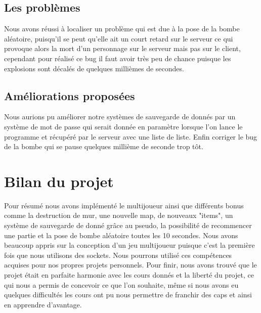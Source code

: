 \documentclass[12pt]{article}
\begin{document}
        \subsection{Les problèmes}
        Nous avons réussi à localiser un problème qui est due à la pose de la bombe aléatoire, puisqu'il se peut qu'elle ait un court retard sur le serveur ce qui provoque alors la mort d'un personnage sur le serveur mais pas sur le client, cependant pour réalisé ce bug il faut avoir très peu de chance puisque les explosions sont décalés de quelques millièmes de secondes.

        \subsection{Améliorations proposées}
        Nous aurions pu améliorer notre systèmes de sauvegarde de donnés par un système de mot de passe qui serait donnée en paramètre lorsque l'on lance le programme et récupéré par le serveur avec une liste de liste.
        Enfin corriger le bug de la bombe qui se pause quelques millième de seconde trop tôt.

    \clearpage
    \section{Bilan du projet}

    Pour résumé nous avons implémenté le multijoueur ainsi que différents bonus comme la destruction de mur, une nouvelle map, de nouveaux "items", un système de sauvegarde de donné grâce au pseudo, la possibilité de recommencer une partie et la pose de bombe aléatoire toutes les 10 secondes.
    Nous avons beaucoup appris sur la conception d'un jeu multijoueur puisque c'est la première fois que nous utilisons des sockets. Nous pourrons utilisé ces compétences acquises pour nos propres projets personnels.
    Pour finir, nous avons trouvé que le projet était en parfaite harmonie avec les cours donnés et la liberté du projet, ce qui nous a permis de concevoir ce que l'on souhaite, même si nous avons eu quelques difficultés les cours ont pu nous permettre de franchir des caps et ainsi en apprendre d'avantage.

    \clearpage
    \nocite{*}
    
    
\end{document}
